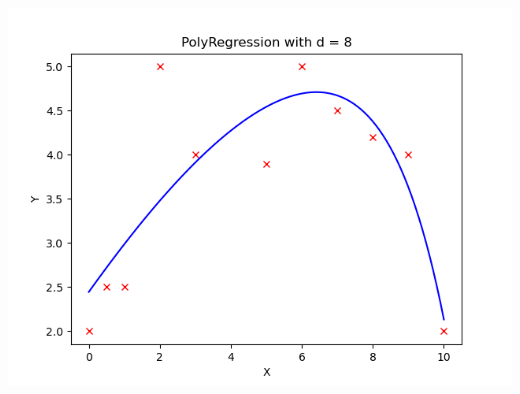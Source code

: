 \documentclass{article}
\begin{document}
\begin{aprob}
\begin{tcolorbox}[colback=lightgray!10!white, colframe=black, title=A3]
\begin{center}
\begin{minipage}{0.45\textwidth}
            \includegraphics[width=\textwidth]{PolyRegression0.1Regularization.png}
        \end{minipage}
        
        \vspace{1em}
        

\end{center}
\end{tcolorbox}
\end{aprob}
\end{document}
